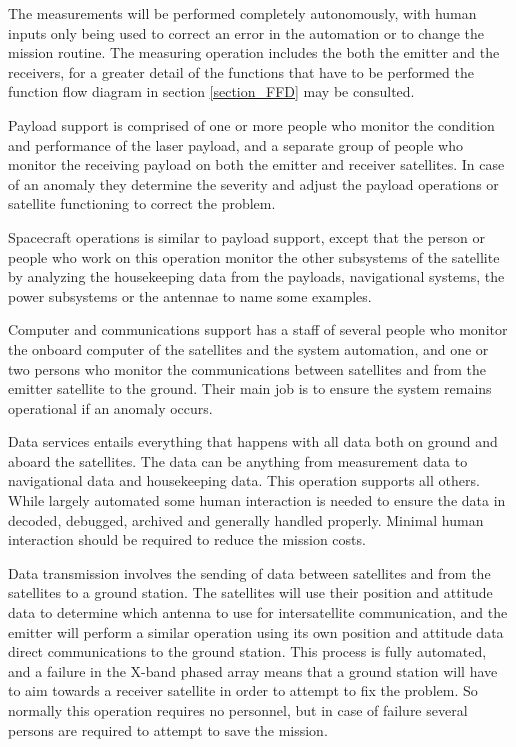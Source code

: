 The measurements will be performed completely autonomously, with human inputs only being used to correct an error in the automation or to change the mission routine. The measuring operation includes the both the emitter and the receivers, for a greater detail of the functions that have to be performed the function flow diagram in section \ref{section_FFD} may be consulted.

Payload support is comprised of one or more people who monitor the condition and performance of the laser payload, and a separate group of people who monitor the receiving payload on both the emitter and receiver satellites. In case of an anomaly they determine the severity and adjust the payload operations or satellite functioning to correct the problem.

Spacecraft operations is similar to payload support, except that the person or people who work on this operation monitor the other subsystems of the satellite by analyzing the housekeeping data from the payloads, navigational systems, the power subsystems or the antennae to name some examples.

Computer and communications support has a staff of several people who monitor the onboard computer of the satellites and the system automation, and one or two persons who monitor the communications between satellites and from the emitter satellite to the ground. Their main job is to ensure the system remains operational if an anomaly occurs.

Data services entails everything that happens with all data both on ground and aboard the satellites. The data can be anything from measurement data to navigational data and housekeeping data. This operation supports all others. While largely automated some human interaction is needed to ensure the data in decoded, debugged, archived and generally handled properly. Minimal human interaction should be required to reduce the mission costs.

Data transmission involves the sending of data between satellites and from the satellites to a ground station. The satellites will use their position and attitude data to determine which antenna to use for intersatellite communication, and the emitter will perform a similar operation using its own position and attitude data direct communications to the ground station. This process is fully automated, and a failure in the X-band phased array means that a ground station will have to aim towards a receiver satellite in order to attempt to fix the problem. So normally this operation requires no personnel, but in case of failure several persons are required to attempt to save the mission.